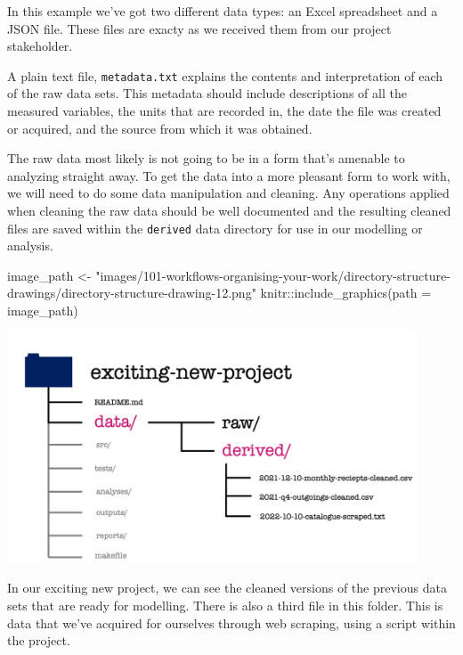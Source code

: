 \documentclass[
  letterpaper,
  DIV=11,
  numbers=noendperiod]{scrreprt}
\newenvironment{Shaded}{\begin{snugshade}}{\end{snugshade}}
\newcommand{\AttributeTok}[1]{\textcolor[rgb]{0.40,0.45,0.13}{#1}}
\newcommand{\FunctionTok}[1]{\textcolor[rgb]{0.28,0.35,0.67}{#1}}
\newcommand{\NormalTok}[1]{\textcolor[rgb]{0.00,0.23,0.31}{#1}}
\newcommand{\OtherTok}[1]{\textcolor[rgb]{0.00,0.23,0.31}{#1}}
\newcommand{\SpecialCharTok}[1]{\textcolor[rgb]{0.37,0.37,0.37}{#1}}
\newcommand{\StringTok}[1]{\textcolor[rgb]{0.13,0.47,0.30}{#1}}
\begin{document}
In this example we've got two different data types: an Excel spreadsheet
and a JSON file. These files are exacty as we received them from our
project stakeholder.

A plain text file, \texttt{metadata.txt} explains the contents and
interpretation of each of the raw data sets. This metadata should
include descriptions of all the measured variables, the units that are
recorded in, the date the file was created or acquired, and the source
from which it was obtained.

The raw data most likely is not going to be in a form that's amenable to
analyzing straight away. To get the data into a more pleasant form to
work with, we will need to do some data manipulation and cleaning. Any
operations applied when cleaning the raw data should be well documented
and the resulting cleaned files are saved within the \texttt{derived}
data directory for use in our modelling or analysis.

\begin{Shaded}
\begin{Highlighting}[]
\NormalTok{image\_path }\OtherTok{\textless{}{-}} \StringTok{"images/101{-}workflows{-}organising{-}your{-}work/directory{-}structure{-}drawings/directory{-}structure{-}drawing{-}12.png"}
\NormalTok{knitr}\SpecialCharTok{::}\FunctionTok{include\_graphics}\NormalTok{(}\AttributeTok{path =}\NormalTok{ image\_path)}
\end{Highlighting}
\end{Shaded}

\includegraphics[width=4.8in,height=\textheight]{images/101-workflows-organising-your-work/directory-structure-drawings/directory-structure-drawing-12.png}

In our exciting new project, we can see the cleaned versions of the
previous data sets that are ready for modelling. There is also a third
file in this folder. This is data that we've acquired for ourselves
through web scraping, using a script within the project.
\end{document}
